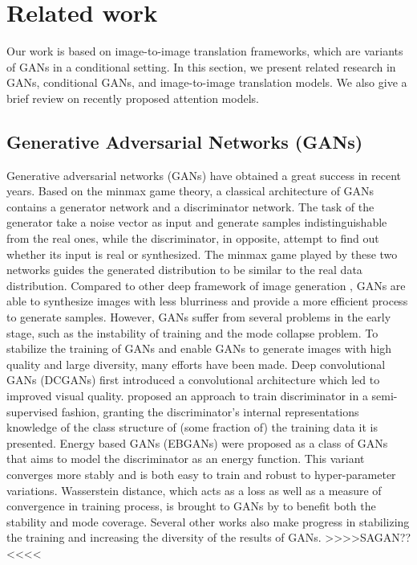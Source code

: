 \section{Related work}
Our work is based on image-to-image translation frameworks, which are variants of GANs in a conditional setting. In this section, we present related research in GANs, conditional GANs, and image-to-image translation models. We also give a brief review on recently proposed attention models.
\subsection{Generative Adversarial Networks (GANs)}
Generative adversarial networks (GANs) \cite{GANs} have obtained a great success in recent years.
Based on the minmax game theory, a classical architecture of GANs contains a generator network and a discriminator network. The task of the generator take a noise vector as input and generate samples indistinguishable from the real ones, while the discriminator, in opposite, attempt to find out whether its input is real or synthesized. The minmax game played by these two networks guides the generated distribution to be similar to the real data distribution. Compared to other deep  framework of image generation \cite{VAEs, PixCNNs}, GANs are able to synthesize images with less blurriness and provide a more efficient process to generate samples. However, GANs suffer from several problems in the early stage, such as the instability of training and the mode collapse problem. To stabilize the training of GANs and enable GANs to generate images with high quality and large diversity, many efforts have been made. Deep convolutional GANs (DCGANs) \cite{DCGANs} first introduced a convolutional architecture which led to improved visual quality. \cite{Improved_Techniques} proposed an approach to train discriminator in a semi-supervised fashion, granting the discriminator’s internal representations knowledge of the class structure of (some fraction of) the training data it is presented. Energy based GANs (EBGANs) \cite{EBGANs}  were proposed as a class of GANs that aims to model the discriminator as an energy function. This variant converges more stably and is both easy to train and robust to hyper-parameter variations. Wasserstein distance, which acts as a loss as well as a measure of convergence in training process, is brought to GANs by \cite{WGANs, WGANs-GP} to benefit both the stability and mode coverage. Several other works \cite{LSGANs, BEGANs, DRAGANs} also make progress in stabilizing the training and increasing the diversity of the results of GANs. >>>>SAGAN??<<<<
%


